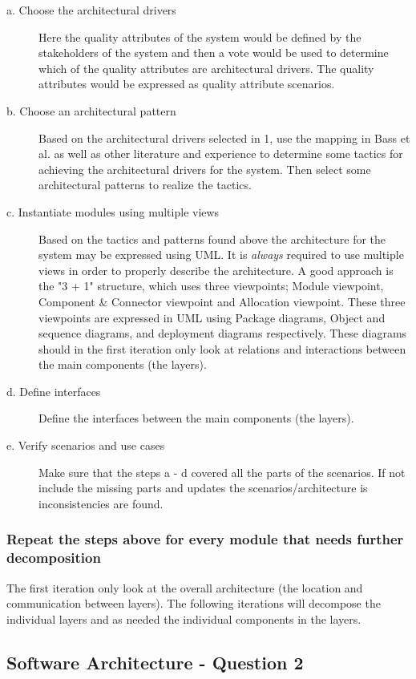 \begin{description}
    \item[a. Choose the architectural drivers]
  Here the quality attributes of the system would be defined by the stakeholders of the system and then a vote would be used to determine which of the quality attributes are architectural drivers. The quality attributes would be expressed as quality attribute scenarios.
    \item[b. Choose an architectural pattern]
  Based on the architectural drivers selected in 1, use the mapping in Bass et al. as well as other literature and experience to determine some tactics for achieving the architectural drivers for the system. Then select some architectural patterns to realize the tactics.
    \item[c. Instantiate modules using multiple views]
  Based on the tactics and patterns found above the architecture for the system may be expressed using UML. It is \emph{always} required to use multiple views in order to properly describe the architecture. A good approach is the "3 + 1" structure, which uses three viewpoints; Module viewpoint, Component \& Connector viewpoint and Allocation viewpoint. These three viewpoints are expressed in UML using Package diagrams, Object and sequence diagrams, and deployment diagrams respectively. These diagrams should in the first iteration only look at relations and interactions between the main components (the layers).
    \item[d. Define interfaces]
  Define the interfaces between the main components (the layers).
    \item[e. Verify scenarios and use cases]
  Make sure that the steps a - d covered all the parts of the scenarios. If not include the missing parts and updates the scenarios/architecture is inconsistencies are found.
\end{description}
\subsubsection{Repeat the steps above for every module that needs further decomposition}
The first iteration only look at the overall architecture (the location and communication between layers). The following iterations will decompose the individual layers and as needed the individual components in the layers.

\subsection{Software Architecture - Question 2}

